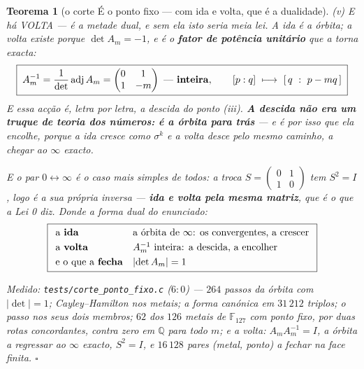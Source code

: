 \documentclass[11pt,a4paper]{article}
\newtheorem{teorema}{Teorema}
\newcommand{\code}[1]{\texttt{\small #1}}
\begin{document}
\begin{teorema}[o corte É o ponto fixo --- com ida e volta, que é a
dualidade]
\emph{(v) E há VOLTA --- é a metade dual, e sem ela isto seria meia lei.} A ida é a
órbita; a volta existe porque $\det A_m=-1$, e é o \textbf{fator de potência unitário}
que a torna exacta:
\[
\boxed{\;A_m^{-1}=\frac{1}{\det}\operatorname{adj}A_m
=\begin{pmatrix}0&1\\1&-m\end{pmatrix}\ \text{---\ \textbf{inteira}},
\qquad
[p:q]\ \longmapsto\ [\,q\ :\ p-mq\,]\;}
\]
E essa acção é, \emph{letra por letra}, a descida do ponto (iii). \textbf{A descida não
era um truque de teoria dos números: é a órbita para trás} --- e é por isso que ela
encolhe, porque a ida cresce como $\sigma^{k}$ e a volta desce pelo mesmo caminho, a
chegar ao $\infty$ exacto.

\noindent E o par $0\leftrightarrow\infty$ é o caso mais simples de todos: a troca
$S=\begin{pmatrix}0&1\\1&0\end{pmatrix}$ tem $S^{2}=I$, logo é a \emph{sua
própria} inversa --- \textbf{ida e volta pela mesma matriz}, que é o que a Lei 0 diz.
Donde a forma dual do enunciado:
\[
\boxed{
\begin{array}{ll}
\text{a \textbf{ida}} & \text{a órbita de }\infty\text{: os convergentes, a crescer}\\[3pt]
\text{a \textbf{volta}} & A_m^{-1}\text{ inteira: a descida, a encolher}\\[3pt]
\text{e o que a \textbf{fecha}} & \lvert\det A_m\rvert=1
\end{array}}
\]

\emph{Medido:} \code{tests/corte\_ponto\_fixo.c} ($6{:}0$) --- $264$ passos da órbita
com $\lvert\det\rvert=1$; Cayley--Hamilton nos metais; a forma canónica em $31\,212$
triplos; o passo nos seus dois membros; $62$ dos $126$ metais de
$\mathbb{F}_{127}$ com ponto fixo, por duas rotas concordantes, contra \emph{zero}
em $\mathbb{Q}$ para todo $m$; e a volta: $A_mA_m^{-1}=I$, a órbita a regressar ao
$\infty$ exacto, $S^{2}=I$, e $16\,128$ pares (metal, ponto) a fechar na face finita.
$\square$
\end{teorema}
\end{document}
